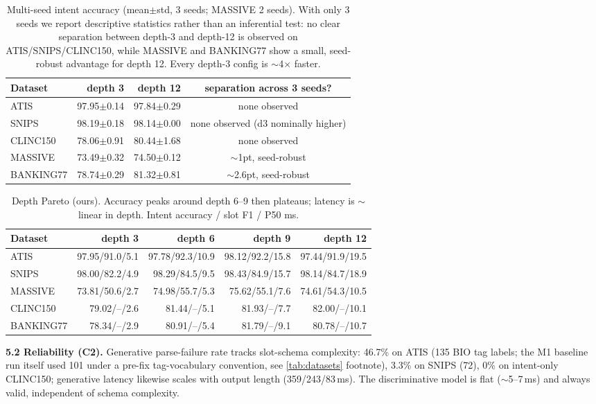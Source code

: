 \documentclass{article}
\begin{document}
\begin{table}[t]\centering
\caption{Multi-seed intent accuracy (mean$\pm$std, 3 seeds; MASSIVE 2 seeds).
With only 3 seeds we report descriptive statistics rather than an inferential
test: no clear separation between depth-3 and depth-12 is observed on
ATIS/SNIPS/CLINC150, while MASSIVE and BANKING77 show a small, seed-robust
advantage for depth 12. Every depth-3 config is $\sim$4$\times$ faster.}
\begin{tabular}{lrrc}
\toprule
Dataset & depth 3 & depth 12 & separation across 3 seeds?\\
\midrule
ATIS & 97.95$\pm$0.14 & 97.84$\pm$0.29 & none observed\\
SNIPS & 98.19$\pm$0.18 & 98.14$\pm$0.00 & none observed (d3 nominally higher)\\
CLINC150 & 78.06$\pm$0.91 & 80.44$\pm$1.68 & none observed\\
MASSIVE & 73.49$\pm$0.32 & 74.50$\pm$0.12 & $\sim$1pt, seed-robust\\
BANKING77 & 78.74$\pm$0.29 & 81.32$\pm$0.81 & $\sim$2.6pt, seed-robust\\
\bottomrule
\end{tabular}
\end{table}

\begin{table}[t]\centering
\caption{Depth Pareto (ours). Accuracy peaks around depth 6--9 then plateaus;
latency is $\sim$linear in depth. Intent accuracy / slot F1 / P50 ms.}
\small
\begin{tabular}{lrrrr}
\toprule
Dataset & depth 3 & depth 6 & depth 9 & depth 12\\
\midrule
ATIS & 97.95/91.0/5.1 & 97.78/92.3/10.9 & 98.12/92.2/15.8 & 97.44/91.9/19.5\\
SNIPS & 98.00/82.2/4.9 & 98.29/84.5/9.5 & 98.43/84.9/15.7 & 98.14/84.7/18.9\\
MASSIVE & 73.81/50.6/2.7 & 74.98/55.7/5.3 & 75.62/55.1/7.6 & 74.61/54.3/10.5\\
CLINC150 & 79.02/--/2.6 & 81.44/--/5.1 & 81.93/--/7.7 & 82.00/--/10.1\\
BANKING77 & 78.34/--/2.9 & 80.91/--/5.4 & 81.79/--/9.1 & 80.78/--/10.7\\
\bottomrule
\end{tabular}
\end{table}

\textbf{5.2 Reliability (C2).} Generative parse-failure rate tracks slot-schema
complexity: 46.7\% on ATIS (135 BIO tag labels; the M1 baseline run itself
used 101 under a pre-fix tag-vocabulary convention, see \cref{tab:datasets}
footnote), 3.3\% on SNIPS (72), 0\% on
intent-only CLINC150; generative latency likewise scales with output length
(359/243/83\,ms). The discriminative model is flat ($\sim$5--7\,ms) and always
valid, independent of schema complexity.
\end{document}
